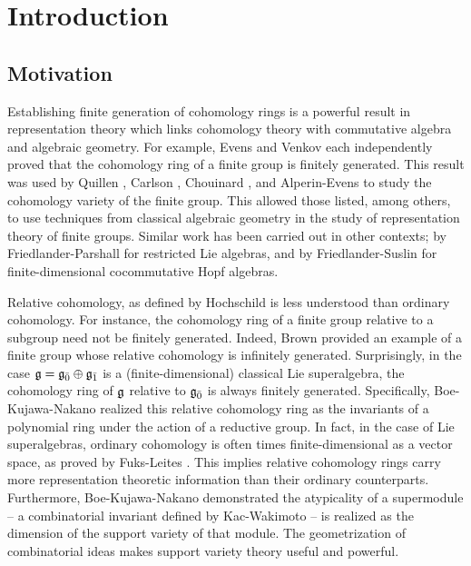 \chapter{Introduction}
\label{chap:intro}

\section{Motivation}

Establishing finite generation of cohomology rings is a powerful result in representation theory which links cohomology theory with commutative algebra and algebraic geometry. For example, Evens \cite{Evens-cohomology-ring} and Venkov \cite{MR0108788} each independently proved that the cohomology ring of a finite group is finitely generated. This result was used by Quillen \cite{MR0298694}, Carlson \cite{MR723070}, Chouinard \cite{MR0401943}, and Alperin-Evens \cite{MR621284} to study the cohomology variety of the finite group. This allowed those listed, among others, to use techniques from classical algebraic geometry in the study of representation theory of finite groups. Similar work has been carried out in other contexts; by Friedlander-Parshall \cite{FP-unipotent,MR860682} for restricted Lie algebras, and by Friedlander-Suslin \cite{MR1427618} for finite-dimensional cocommutative Hopf algebras.

Relative cohomology, as defined by Hochschild \cite{hochschild} is less understood than ordinary cohomology. For instance, the cohomology ring of a finite group relative to a subgroup need not be finitely generated. Indeed, Brown \cite{MR1310744} provided an example of a finite group whose relative cohomology is infinitely generated. Surprisingly, in the case $\mathfrak{g} = {\mathfrak{g}}_{\bar{0}} \oplus {\mathfrak{g}}_{\bar{1}}$ is a (finite-dimensional) classical Lie superalgebra, the cohomology ring of $\mathfrak{g}$ relative to ${\mathfrak{g}}_{\bar{0}}$ is always finitely generated. Specifically, Boe-Kujawa-Nakano \cite{BKN-1} realized this relative cohomology ring as the invariants of a polynomial ring under the action of a reductive group. In fact, in the case of Lie superalgebras, ordinary cohomology is often times finite-dimensional as a vector space, as proved by Fuks-Leites \cite{fuks1984cohomology}
. This implies relative cohomology rings carry more representation theoretic information than their ordinary counterparts. Furthermore, Boe-Kujawa-Nakano \cite{BKN-1} demonstrated the atypicality of a supermodule -- a combinatorial invariant defined by Kac-Wakimoto \cite{MR1327543} -- is realized as the dimension of the support variety of that module. The geometrization of combinatorial ideas makes support variety theory useful and powerful.

